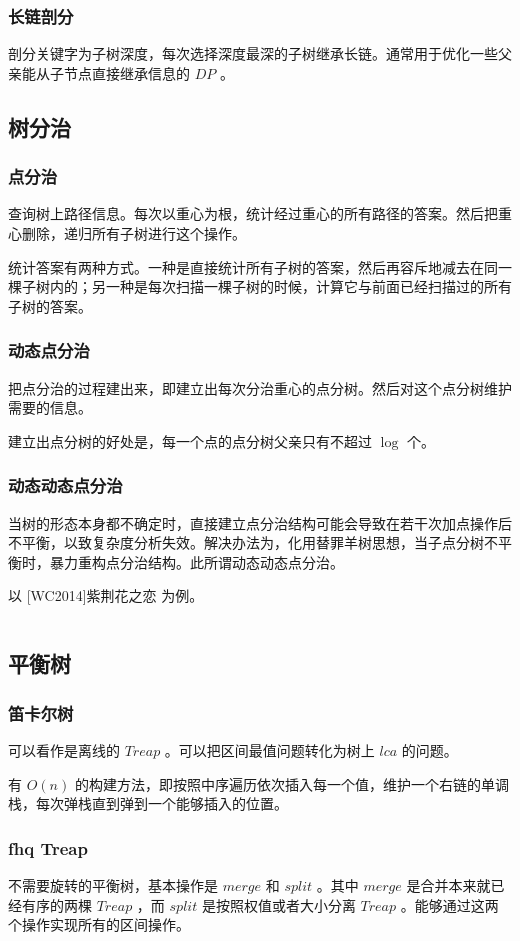 \documentclass[UTF-8]{ctexart}
\newcommand{\cpp}[1]{\inputminted[bgcolor=bg,breaklines,breakanywhere=true]{c++}{#1}}
\begin{document}
			\subsubsection{长链剖分}
			剖分关键字为子树深度，每次选择深度最深的子树继承长链。通常用于优化一些父亲能从子节点直接继承信息的 $DP$ 。
		\subsection{树分治}
			\subsubsection{点分治}
			查询树上路径信息。每次以重心为根，统计经过重心的所有路径的答案。然后把重心删除，递归所有子树进行这个操作。
	
			统计答案有两种方式。一种是直接统计所有子树的答案，然后再容斥地减去在同一棵子树内的；另一种是每次扫描一棵子树的时候，计算它与前面已经扫描过的所有子树的答案。
				\subsubsection{动态点分治}
				把点分治的过程建出来，即建立出每次分治重心的点分树。然后对这个点分树维护需要的信息。
	
				建立出点分树的好处是，每一个点的点分树父亲只有不超过 $\log$ 个。
				\subsubsection{动态动态点分治}
				当树的形态本身都不确定时，直接建立点分治结构可能会导致在若干次加点操作后不平衡，以致复杂度分析失效。解决办法为，化用替罪羊树思想，当子点分树不平衡时，暴力重构点分治结构。此所谓动态动态点分治。
				
				以 [WC2014]紫荆花之恋 为例。
				\cpp{code//Example/UOJ55.cpp}
		\subsection{平衡树}
			\subsubsection{笛卡尔树}
			可以看作是离线的 $Treap$ 。可以把区间最值问题转化为树上 $lca$ 的问题。
	
			有 $O(n)$ 的构建方法，即按照中序遍历依次插入每一个值，维护一个右链的单调栈，每次弹栈直到弹到一个能够插入的位置。
			\subsubsection{fhq Treap}
			不需要旋转的平衡树，基本操作是 $merge$ 和 $split$ 。其中 $merge$ 是合并本来就已经有序的两棵 $Treap$ ，而 $split$ 是按照权值或者大小分离 $Treap$ 。能够通过这两个操作实现所有的区间操作。
			
\end{document}
